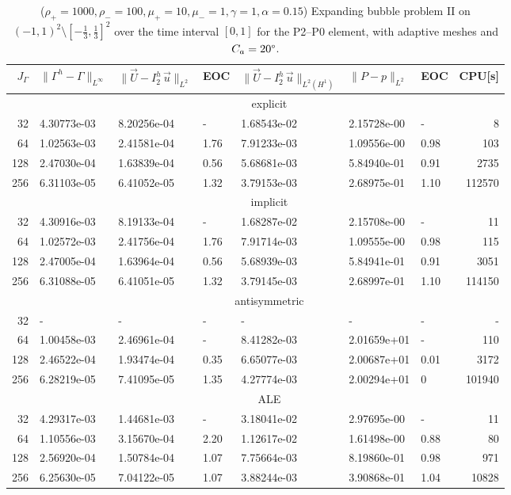\documentclass[a4paper,12pt,onecolumn]{article}
\newcommand{\errorXx}{\|\Gamma^h - \Gamma\|_{L^\infty}}
\newcommand{\LerrorUu}[1]{\|\vec U - I^h_{#1}\,\vec u\|_{L^2}}
\newcommand{\HerrorUu}[1]{\|\vec U - I^h_{#1}\,\vec u\|_{L^2(H^1)}}
\newcommand{\LerrorPp}{\|P - p\|_{L^2}}
\begin{document}
\begin{table}
\center
\hspace*{-3.25cm}
\begin{tabular}{rllllllr}
\hline
$J_\Gamma$ & $\errorXx$ & $\LerrorUu2$ & EOC & $\HerrorUu2$ & $\LerrorPp$ & EOC
& CPU[s] \\
\hline
& \multicolumn{7}{c}{explicit} \\
\hline
 32 & 4.30773e-03 & 8.20256e-04 &    - & 1.68543e-02 & 2.15728e-00 &    - &
8 \\
 64 & 1.02563e-03 & 2.41581e-04 & 1.76 & 7.91233e-03 & 1.09556e-00 & 0.98 &
103 \\
128 & 2.47030e-04 & 1.63839e-04 & 0.56 & 5.68681e-03 & 5.84940e-01 & 0.91 &
2735 \\
256 & 6.31103e-05 & 6.41052e-05 & 1.32 & 3.79153e-03 & 2.68975e-01 & 1.10 &
112570 \\
\hline
& \multicolumn{7}{c}{implicit} \\
\hline
 32 & 4.30916e-03 & 8.19133e-04 &    - & 1.68287e-02 & 2.15708e-00 &    - &
11 \\
 64 & 1.02572e-03 & 2.41756e-04 & 1.76 & 7.91714e-03 & 1.09555e-00 & 0.98 &
115 \\
128 & 2.47005e-04 & 1.63964e-04 & 0.56 & 5.68939e-03 & 5.84941e-01 & 0.91 &
3051 \\
256 & 6.31088e-05 & 6.41051e-05 & 1.32 & 3.79145e-03 & 2.68997e-01 & 1.10 &
114150 \\
\hline
& \multicolumn{7}{c}{antisymmetric} \\
\hline
 32 &           - &           - &    - &           - &           - &    - &
- \\
 64 & 1.00458e-03 & 2.46961e-04 &    - & 8.41282e-03 & 2.01659e+01 &    - &
110 \\
128 & 2.46522e-04 & 1.93474e-04 & 0.35 & 6.65077e-03 & 2.00687e+01 & 0.01 &
3172 \\
256 & 6.28219e-05 & 7.41095e-05 & 1.35 & 4.27774e-03 & 2.00294e+01 &    0 &
101940 \\
\hline
& \multicolumn{7}{c}{ALE} \\
\hline
 32 & 4.29317e-03 & 1.44681e-03 &    - & 3.18041e-02 & 2.97695e-00 &    - &
11 \\
 64 & 1.10556e-03 & 3.15670e-04 & 2.20 & 1.12617e-02 & 1.61498e-00 & 0.88 &
80 \\
128 & 2.56920e-04 & 1.50784e-04 & 1.07 & 7.75664e-03 & 8.19860e-01 & 0.98 &
971 \\
256 & 6.25630e-05 & 7.04122e-05 & 1.07 & 3.88244e-03 & 3.90868e-01 & 1.04 &
10828 \\
\hline
\end{tabular}
\hspace*{-3.25cm}
\caption[Navier--Stokes expanding bubble II errors P2--P0]
{($\rho_+ = 1000,\rho_- = 100,\mu_+ = 10,\mu_- =1,\gamma = 1,\alpha=0.15$)
Expanding bubble problem II on $(-1,1)^2\setminus[-\frac{1}{3},\frac{1}{3}]^2$
over the time interval $[0,1]$ for the P2--P0 element, with adaptive
meshes and $C_a=20\degree$.}
\label{tab:nsexpandingbubbleIIp2p0}
\end{table}
\end{document}
